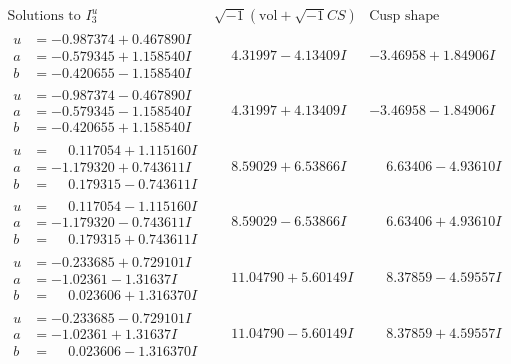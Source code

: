 \documentclass[1p]{elsarticle_modified}
\theoremstyle{definition}
\newcommand{\I}{\sqrt{-1}}
\begin{document}
$$\begin{array}{c|c|c}  
\text{Solutions to }I^u_{3}& \I (\text{vol} + \sqrt{-1}CS) & \text{Cusp shape}\\
 \hline 
\begin{aligned}
u &= -0.987374 + 0.467890 I \\
a &= -0.579345 + 1.158540 I \\
b &= -0.420655 - 1.158540 I\end{aligned}
 & \phantom{-}4.31997 - 4.13409 I & -3.46958 + 1.84906 I \\ \hline\begin{aligned}
u &= -0.987374 - 0.467890 I \\
a &= -0.579345 - 1.158540 I \\
b &= -0.420655 + 1.158540 I\end{aligned}
 & \phantom{-}4.31997 + 4.13409 I & -3.46958 - 1.84906 I \\ \hline\begin{aligned}
u &= \phantom{-}0.117054 + 1.115160 I \\
a &= -1.179320 + 0.743611 I \\
b &= \phantom{-}0.179315 - 0.743611 I\end{aligned}
 & \phantom{-}8.59029 + 6.53866 I & \phantom{-}6.63406 - 4.93610 I \\ \hline\begin{aligned}
u &= \phantom{-}0.117054 - 1.115160 I \\
a &= -1.179320 - 0.743611 I \\
b &= \phantom{-}0.179315 + 0.743611 I\end{aligned}
 & \phantom{-}8.59029 - 6.53866 I & \phantom{-}6.63406 + 4.93610 I \\ \hline\begin{aligned}
u &= -0.233685 + 0.729101 I \\
a &= -1.02361 - 1.31637 I \\
b &= \phantom{-}0.023606 + 1.316370 I\end{aligned}
 & \phantom{-}11.04790 + 5.60149 I & \phantom{-}8.37859 - 4.59557 I \\ \hline\begin{aligned}
u &= -0.233685 - 0.729101 I \\
a &= -1.02361 + 1.31637 I \\
b &= \phantom{-}0.023606 - 1.316370 I\end{aligned}
 & \phantom{-}11.04790 - 5.60149 I & \phantom{-}8.37859 + 4.59557 I \\ \hline\begin{aligned}

\end{aligned}
\end{array}$$
\end{document}
